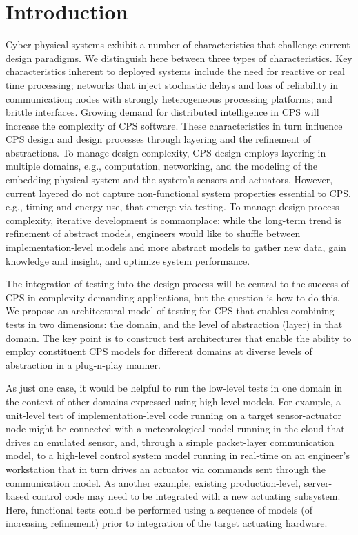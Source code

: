 \section{Introduction}

Cyber-physical systems exhibit a number of characteristics that challenge current design paradigms.  We distinguish here between three types of characteristics. Key characteristics inherent to deployed systems include the need for reactive or real time processing; networks that inject stochastic delays and loss of reliability in communication; nodes with strongly heterogeneous processing platforms; and brittle interfaces. Growing demand for distributed intelligence in CPS will increase the complexity of CPS software. These characteristics in turn influence CPS design and design processes through layering and the refinement of abstractions. To manage design complexity, CPS design employs layering in multiple domains, e.g., computation, networking, and the modeling of the embedding physical system and the system's sensors and actuators. However, current layered do not capture non-functional system properties essential to CPS, e.g., timing and energy use, that emerge via testing.  To manage design process complexity, iterative development is commonplace: while the long-term trend is refinement of abstract models, engineers would like to shuffle between implementation-level models and more abstract models to gather new data, gain knowledge and insight, and optimize system performance. 

The integration of testing into the design process will be central to the success of CPS in complexity-demanding applications, but the question is how to do this. We propose an architectural model of testing for CPS that enables combining tests in two dimensions: the domain, and the level of abstraction (layer) in that domain.  The key point is to construct test architectures  that enable the ability to employ constituent CPS models for different domains at diverse levels of abstraction in a plug-n-play manner.

As just one case, it would be helpful to run the low-level tests in one domain in the context of other domains expressed using high-level models. For example, a unit-level test of implementation-level code running on a target sensor-actuator node might be connected with a meteorological model running in the cloud that drives an emulated sensor, and, through a simple packet-layer communication model, to a high-level control system model running in real-time on an engineer's workstation that in turn drives an actuator via commands sent through the communication model. As another example, existing production-level, server-based control code may need to be integrated with a new actuating subsystem. Here, functional tests could be performed using a sequence of models (of increasing refinement) prior to integration of the target actuating hardware.

